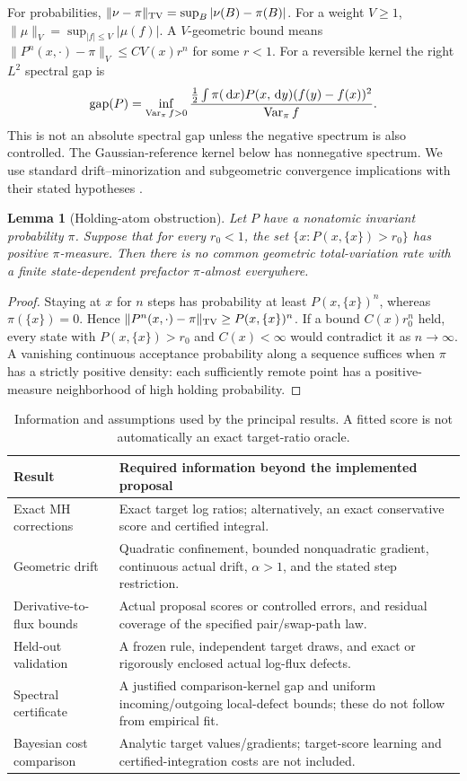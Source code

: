 \documentclass[pdflatex,iicol,sn-mathphys-ay]{sn-jnl}
\newtheorem{lemma}[theorem]{Lemma}
\theoremstyle{definition}\newtheorem{definition}[theorem]{Definition}
\theoremstyle{remark}\newtheorem{remark}[theorem]{Remark}
\numberwithin{equation}{section}
\newcommand{\dd}{\,\mathrm d}\newcommand{\cA}{c_\alpha}\newcommand{\sg}{\operatorname{sigmoid}}
\newcommand{\gap}{\operatorname{gap}}\newcommand{\osc}{\operatorname{osc}}
\newcommand{\1}{\mathbf 1}
\begin{document}
For probabilities, $\|\nu-\pi\|_{\mathrm{TV}}=\sup_B|\nu(B)-\pi(B)|$. For a weight $V\ge1$, $\|\mu\|_V=\sup_{|f|\le V}|\mu(f)|$. A $V$-geometric bound means $\|P^n(x,\cdot)-\pi\|_V\le CV(x)r^n$ for some $r<1$. For a reversible kernel the right $L^2$ spectral gap is
\[
\gap(P)=\inf_{\Var_\pi f>0}
\frac{\frac12\int\pi(\dd x)P(x,\dd y)(f(y)-f(x))^2}{\Var_\pi f}.
\]
This is not an absolute spectral gap unless the negative spectrum is also controlled. The Gaussian-reference kernel below has nonnegative spectrum. We use standard drift--minorization and subgeometric convergence implications with their stated hypotheses \citep{roberts,douc}.

\begin{lemma}[Holding-atom obstruction]\label{lem:holding}
Let $P$ have a nonatomic invariant probability $\pi$. Suppose that for every $r_0<1$, the set $\{x:P(x,\{x\})>r_0\}$ has positive $\pi$-measure. Then there is no common geometric total-variation rate with a finite state-dependent prefactor $\pi$-almost everywhere.
\end{lemma}
\begin{proof}
Staying at $x$ for $n$ steps has probability at least $P(x,\{x\})^n$, whereas $\pi(\{x\})=0$. Hence $\|P^n(x,\cdot)-\pi\|_{\mathrm{TV}}\ge P(x,\{x\})^n$. If a bound $C(x)r_0^n$ held, every state with $P(x,\{x\})>r_0$ and $C(x)<\infty$ would contradict it as $n\to\infty$. A vanishing continuous acceptance probability along a sequence suffices when $\pi$ has a strictly positive density: each sufficiently remote point has a positive-measure neighborhood of high holding probability.
\end{proof}

\begin{table}[t]\centering\small
\caption{Information and assumptions used by the principal results. A fitted score is not automatically an exact target-ratio oracle.}\label{tab:oracles}
\begin{tabular}{@{}p{.25\linewidth}p{.68\linewidth}@{}}\toprule
Result & Required information beyond the implemented proposal \\\midrule
Exact MH corrections & Exact target log ratios; alternatively, an exact conservative score and certified integral. \\
Geometric drift & Quadratic confinement, bounded nonquadratic gradient, continuous actual drift, $\alpha>1$, and the stated step restriction. \\
Derivative-to-flux bounds & Actual proposal scores or controlled errors, and residual coverage of the specified pair/swap-path law. \\
Held-out validation & A frozen rule, independent target draws, and exact or rigorously enclosed actual log-flux defects. \\
Spectral certificate & A justified comparison-kernel gap and uniform incoming/outgoing local-defect bounds; these do not follow from empirical fit. \\
Bayesian cost comparison & Analytic target values/gradients; target-score learning and certified-integration costs are not included. \\\bottomrule
\end{tabular}
\end{table}
\end{document}
